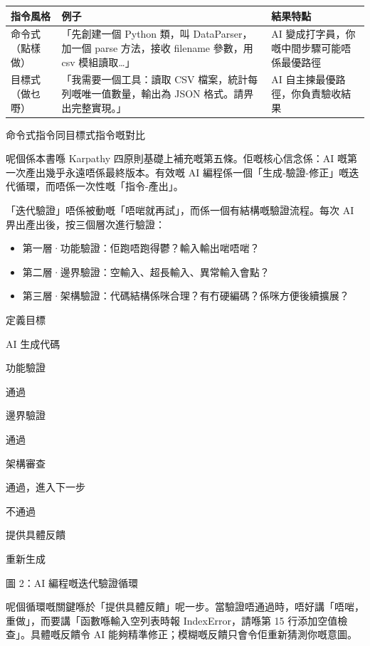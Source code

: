\begin{center}
\begin{tabularx}{\linewidth}{|X|X|X|}
\hline
\textbf{指令風格} & \textbf{例子} & \textbf{結果特點} \tabularnewline
\hline
命令式（點樣做） & 「先創建一個 Python 類，叫 DataParser，加一個 parse 方法，接收 filename 參數，用 csv 模組讀取…」 & AI 變成打字員，你嘅中間步驟可能唔係最優路徑 \tabularnewline
目標式（做乜嘢） & 「我需要一個工具：讀取 CSV 檔案，統計每列嘅唯一值數量，輸出為 JSON 格式。請畀出完整實現。」 & AI 自主揀最優路徑，你負責驗收結果 \tabularnewline
\hline
\end{tabularx}
\end{center}

\begin{center}\small\color{gray}命令式指令同目標式指令嘅對比\end{center}


呢個係本書喺 Karpathy 四原則基礎上補充嘅第五條。佢嘅核心信念係：AI 嘅第一次產出幾乎永遠唔係最終版本。有效嘅 AI 編程係一個「生成-驗證-修正」嘅迭代循環，而唔係一次性嘅「指令-產出」。

「迭代驗證」唔係被動嘅「唔啱就再試」，而係一個有結構嘅驗證流程。每次 AI 畀出產出後，按三個層次進行驗證：

\begin{itemize}
  \item 第一層·功能驗證：佢跑唔跑得鬱？輸入輸出啱唔啱？
  \item 第二層·邊界驗證：空輸入、超長輸入、異常輸入會點？
  \item 第三層·架構驗證：代碼結構係咪合理？有冇硬編碼？係咪方便後續擴展？
\end{itemize}

定義目標

AI 生成代碼

功能驗證

通過

邊界驗證

通過

架構審查

通過，進入下一步

不通過

提供具體反饋

重新生成

\begin{center}\small\color{gray}圖 2：AI 編程嘅迭代驗證循環\end{center}

呢個循環嘅關鍵喺於「提供具體反饋」呢一步。當驗證唔通過時，唔好講「唔啱，重做」，而要講「函數喺輸入空列表時報 IndexError，請喺第 15 行添加空值檢查」。具體嘅反饋令 AI 能夠精準修正；模糊嘅反饋只會令佢重新猜測你嘅意圖。

